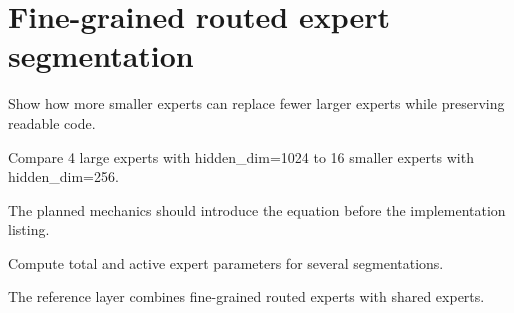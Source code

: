 \section{Fine-grained routed expert segmentation}
\label{sec:ch08-fine-grained-routed-expert-segmentation}

Show how more smaller experts can replace fewer larger experts while preserving readable code.



Compare 4 large experts with hidden\_dim=1024 to 16 smaller experts with hidden\_dim=256.



The planned mechanics should introduce the equation before the implementation listing.





\begin{checkpointbox}
Compute total and active expert parameters for several segmentations.
\end{checkpointbox}

The reference layer combines fine-grained routed experts with shared experts.
